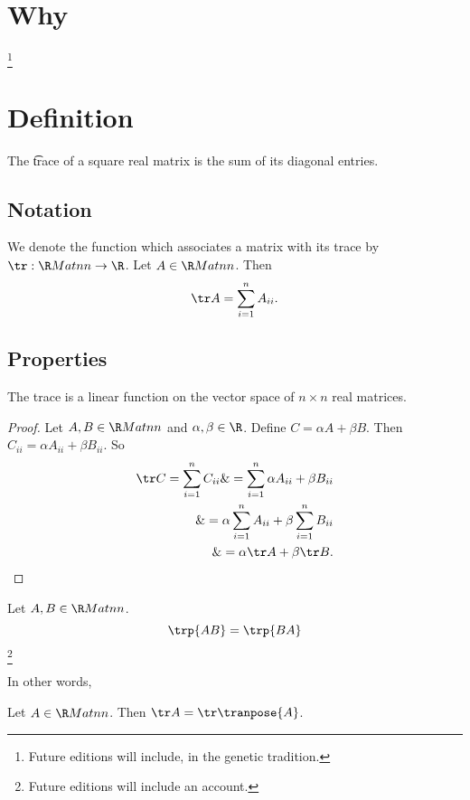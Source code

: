 
\section*{Why}

  \ifhmode\unskip\fi\footnote{
Future editions will include, in the genetic tradition.
  }
\section*{Definition}

The \t{trace} of a square real matrix is the sum of its diagonal entries.

\subsection*{Notation}

We denote the function which associates a matrix with its trace by $\tr: \R Mat{n}{n} \to \R $.
Let $A \in \R Mat{n}{n}$.
Then
  \[
\tr A = \sum_{i = 1}^{n} A_{ii}.
  \]

\subsection*{Properties}

\begin{prop}

The trace is a linear function on the vector space of $n \times n$ real matrices.

\begin{proof}

Let $A, B \in \R Mat{n}{n}$ and $\alpha , \beta  \in \R $.
Define $C = \alpha  A + \beta  B$.
Then $C_{ii} = \alpha  A_{ii} + \beta  B_{ii}$.
So
  \[
\begin{aligned}
\tr C = \sum_{i = 1}^{n} C_{ii} \&= \sum_{i = 1}^{n} \alpha A_{ii} + \beta  B_{ii} \\ \&= \alpha  \sum_{i = 1}^{n} A_{ii} + \beta  \sum_{i = 1}^{n} B_{ii} \\ \&= \alpha  \tr A + \beta \tr B.
\end{aligned}
  \]
\end{proof}
\end{prop}
\begin{prop}

Let $A, B \in \R Mat{n}{n}$.
$$\trp{AB} = \trp{BA}$$
  \ifhmode\unskip\fi\footnote{
Future editions will include an account.
  }

\end{prop}

In other words, 

\begin{prop}
Let $A \in \R Mat{n}{n}$. Then $\tr A = \tr\tranpose{A}$.
\end{prop}
